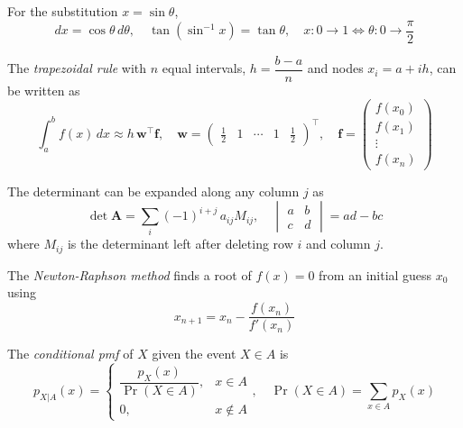 \item For the substitution $x = \sin\theta$,
\begin{equation}
dx = \cos\theta\,d\theta, \quad \tan\left(\sin^{-1}x\right) = \tan\theta, \quad
x: 0 \to 1 \iff \theta: 0 \to \frac{\pi}{2}
\label{c12eq:sinsub}
\end{equation}

\item The \emph{trapezoidal rule} with $n$ equal intervals, $h = \dfrac{b-a}{n}$ and nodes $x_i = a + ih$, can be written as
\begin{equation}
\int_a^b f(x)\,dx \approx h\,\mathbf{w}^{\top}\mathbf{f}, \quad
\mathbf{w} = \begin{pmatrix} \frac{1}{2} & 1 & \cdots & 1 & \frac{1}{2} \end{pmatrix}^{\top}, \quad
\mathbf{f} = \begin{pmatrix} f(x_0) \\ f(x_1) \\ \vdots \\ f(x_n) \end{pmatrix}
\label{c12eq:trapz}
\end{equation}

\item The determinant can be expanded along any column $j$ as
\begin{equation}
\det\mathbf{A} = \sum_{i}(-1)^{i+j}\,a_{ij}M_{ij}, \quad
\begin{vmatrix} a & b \\ c & d \end{vmatrix} = ad - bc
\label{c12eq:det}
\end{equation}
where $M_{ij}$ is the determinant left after deleting row $i$ and column $j$.

\item The \emph{Newton-Raphson method} finds a root of $f(x) = 0$ from an initial guess $x_0$ using
\begin{equation}
x_{n+1} = x_n - \frac{f(x_n)}{f'(x_n)}
\label{c12eq:newton}
\end{equation}

\item The \emph{conditional pmf} of $X$ given the event $X \in A$ is
\begin{equation}
p_{X|A}(x) = \begin{cases} \dfrac{p_X(x)}{\Pr(X \in A)}, & x \in A \\ 0, & x \notin A \end{cases}, \quad
\Pr(X \in A) = \sum_{x \in A} p_X(x)
\label{c12eq:condpmf}
\end{equation}

